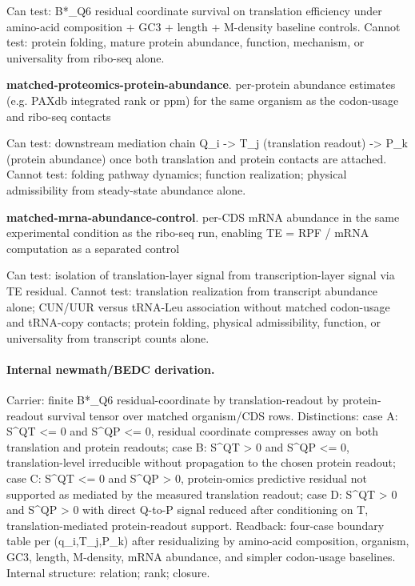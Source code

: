 Can test: B*\_Q6 residual coordinate survival on translation efficiency under amino-acid composition + GC3 + length + M-density baseline controls. Cannot test: protein folding, mature protein abundance, function, mechanism, or universality from ribo-seq alone.

\textbf{matched-proteomics-protein-abundance}. per-protein abundance estimates (e.g. PAXdb integrated rank or ppm) for the same organism as the codon-usage and ribo-seq contacts

Can test: downstream mediation chain Q\_i -> T\_j (translation readout) -> P\_k (protein abundance) once both translation and protein contacts are attached. Cannot test: folding pathway dynamics; function realization; physical admissibility from steady-state abundance alone.

\textbf{matched-mrna-abundance-control}. per-CDS mRNA abundance in the same experimental condition as the ribo-seq run, enabling TE = RPF / mRNA computation as a separated control

Can test: isolation of translation-layer signal from transcription-layer signal via TE residual. Cannot test: translation realization from transcript abundance alone; CUN/UUR versus tRNA-Leu association without matched codon-usage and tRNA-copy contacts; protein folding, physical admissibility, function, or universality from transcript counts alone.

\paragraph{Internal newmath/BEDC derivation.} Carrier: finite B*\_Q6 residual-coordinate by translation-readout by protein-readout survival tensor over matched organism/CDS rows. Distinctions: case A: S\textasciicircum{}QT <= 0 and S\textasciicircum{}QP <= 0, residual coordinate compresses away on both translation and protein readouts; case B: S\textasciicircum{}QT > 0 and S\textasciicircum{}QP <= 0, translation-level irreducible without propagation to the chosen protein readout; case C: S\textasciicircum{}QT <= 0 and S\textasciicircum{}QP > 0, protein-omics predictive residual not supported as mediated by the measured translation readout; case D: S\textasciicircum{}QT > 0 and S\textasciicircum{}QP > 0 with direct Q-to-P signal reduced after conditioning on T, translation-mediated protein-readout support. Readback: four-case boundary table per (q\_i,T\_j,P\_k) after residualizing by amino-acid composition, organism, GC3, length, M-density, mRNA abundance, and simpler codon-usage baselines. Internal structure: relation; rank; closure.

